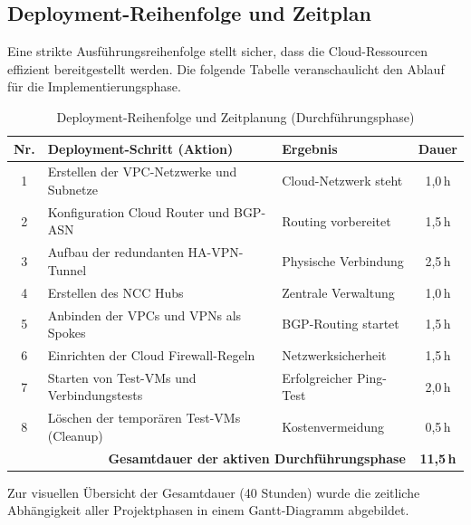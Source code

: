 \subsection*{Deployment-Reihenfolge und Zeitplan}
Eine strikte Ausführungsreihenfolge stellt sicher, dass die Cloud-Ressourcen effizient bereitgestellt werden. Die folgende Tabelle veranschaulicht den Ablauf für die Implementierungsphase.

\begin{table}[!ht]
\centering
\begin{tabularx}{\textwidth}{|c|X|X|c|}
\hline
\textbf{Nr.} & \textbf{Deployment-Schritt (Aktion)} & \textbf{Ergebnis} & \textbf{Dauer} \\ \hline
1 & Erstellen der VPC-Netzwerke und Subnetze & Cloud-Netzwerk steht & 1,0\,h \\ \hline
2 & Konfiguration Cloud Router und BGP-ASN & Routing vorbereitet & 1,5\,h \\ \hline
3 & Aufbau der redundanten HA-VPN-Tunnel & Physische Verbindung & 2,5\,h \\ \hline
4 & Erstellen des NCC Hubs & Zentrale Verwaltung & 1,0\,h \\ \hline
5 & Anbinden der VPCs und VPNs als Spokes & BGP-Routing startet & 1,5\,h \\ \hline
6 & Einrichten der Cloud Firewall-Regeln & Netzwerksicherheit & 1,5\,h \\ \hline
7 & Starten von Test-VMs und Verbindungstests & Erfolgreicher Ping-Test & 2,0\,h \\ \hline
8 & Löschen der temporären Test-VMs (Cleanup) & Kostenvermeidung & 0,5\,h \\ \hline
\multicolumn{3}{|r|}{\textbf{Gesamtdauer der aktiven Durchführungsphase}} & \textbf{11,5\,h} \\ \hline
\end{tabularx}
\caption{Deployment-Reihenfolge und Zeitplanung (Durchführungsphase)}
\end{table}

Zur visuellen Übersicht der Gesamtdauer (40 Stunden) wurde die zeitliche Abhängigkeit aller Projektphasen in einem Gantt-Diagramm abgebildet.

